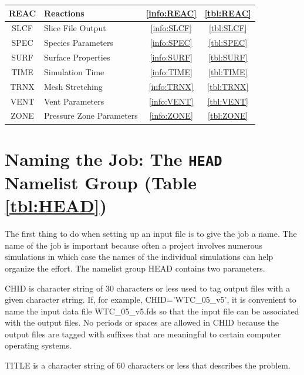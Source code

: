 \documentclass[11pt]{book}
\begin{document}
\begin{table}[ht]
\begin{center}
\begin{tabular}{|c|l|c|c|}
{\ct REAC}  & Reactions                    & \ref{info:REAC} & \ref{tbl:REAC}  \\ \hline
{\ct SLCF}  & Slice File Output            & \ref{info:SLCF} & \ref{tbl:SLCF}  \\ \hline
{\ct SPEC}  & Species Parameters           & \ref{info:SPEC} & \ref{tbl:SPEC}  \\ \hline
{\ct SURF}  & Surface Properties           & \ref{info:SURF} & \ref{tbl:SURF}  \\ \hline
{\ct TIME}  & Simulation Time              & \ref{info:TIME} & \ref{tbl:TIME}  \\ \hline
{\ct TRNX}  & Mesh Stretching              & \ref{info:TRNX} & \ref{tbl:TRNX}  \\ \hline
{\ct VENT}  & Vent Parameters              & \ref{info:VENT} & \ref{tbl:VENT}  \\ \hline
{\ct ZONE}  & Pressure Zone Parameters     & \ref{info:ZONE} & \ref{tbl:ZONE}  \\ \hline
\end{tabular}
\end{center}
\normalsize
\label{tbl:NLGRef}
\end{table}

\clearpage
\section{Naming the Job: The \texorpdfstring{{\tt HEAD}}{HEAD} Namelist Group (Table \ref{tbl:HEAD})}
\label{info:HEAD}

The first thing to do when setting up an input file is to give the
job a name.  The name of the job is important because often a project
involves numerous simulations in which case the names of the individual
simulations can help organize the effort.  The namelist group {\ct HEAD} contains
two parameters.
\begin{description}
\item {\ct CHID} is character string
of 30 characters or less used to tag output files with a given
character string. If, for example, {\ct CHID='WTC\_05\_v5'}, it is convenient to
name the input data file {\ct WTC\_05\_v5.fds} so that the input file
can be associated with the output files. No periods or spaces are allowed in
{\ct CHID} because the output files are tagged with suffixes that
are meaningful to certain computer operating systems.
\item {\ct TITLE} is a character string of 60 characters or less that describes the
problem.
\end{description}
\end{document}
